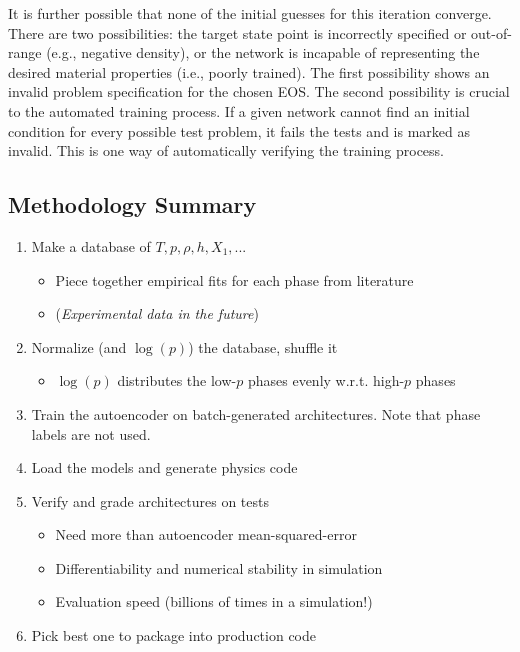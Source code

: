 \documentclass[]{article}
\begin{document}
It is further possible that none of the initial guesses for this iteration
converge. There are two possibilities: the target state point is
incorrectly specified or out-of-range (e.g., negative density), or the
network is incapable of representing the desired material properties
(i.e., poorly trained). The first possibility shows an invalid
problem specification for the chosen EOS. The second possibility is
crucial to the automated training process. If a given network cannot
find an initial condition for every possible test problem, it fails
the tests and is marked as invalid. This is one way of automatically
verifying the training process.


\hypertarget{header-n3493}{%
\subsection{Methodology Summary}\label{header-n3493}}

\begin{enumerate}
\def\labelenumi{\arabic{enumi}.}
\item
  Make a database of \(T,p,\rho,h,X_1,...\)
  \begin{itemize}
  \item
    Piece together empirical fits for each phase from literature
  \item
    (\emph{Experimental data in the future})
  \end{itemize}
\item
  Normalize (and \(\log(p)\)) the database, shuffle it

  \begin{itemize}
  \item
    \(\log(p)\) distributes the low-\(p\) phases evenly w.r.t.
    high-\(p\) phases
  \end{itemize}
\item
  Train the autoencoder on batch-generated architectures. Note that
  phase labels are not used.
\item
  Load the models and generate physics code
\item
  Verify and grade architectures on tests

  \begin{itemize}
  \item
    Need more than autoencoder mean-squared-error
  \item
    Differentiability and numerical stability in simulation
  \item
    Evaluation speed (billions of times in a simulation!)
  \end{itemize}
\item
  Pick best one to package into production code
\end{enumerate}
\end{document}
